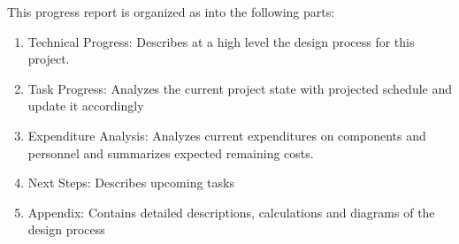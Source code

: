 This progress report is organized as into the following parts:
\begin{enumerate}
	\item Technical Progress: Describes at a high level the design process for this project.
	\item Task Progress: Analyzes the current project state with projected schedule and update it accordingly
	\item Expenditure Analysis: Analyzes current expenditures on components and personnel and summarizes expected remaining costs.
	\item Next Steps: Describes upcoming tasks
	\item Appendix: Contains detailed descriptions, calculations and diagrams of the design process
\end{enumerate}